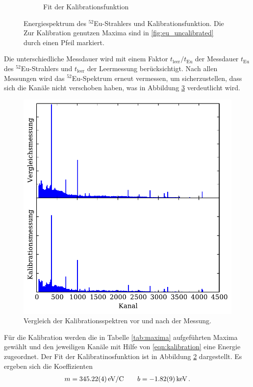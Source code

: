 \begin{figure}[htb]
\begin{subfigure}{.49\linewidth}
        \caption{
            Fit der Kalibrationsfunktion
        }
        \label{fig:calibration}
    \end{subfigure}
    \caption{
        Energiespektrum des $^{52}$Eu-Strahlers und Kalibrationsfunktion.
        Die Zur Kalibration genutzen Maxima sind in \ref{fig:eu_uncalibrated}
        durch einen Pfeil markiert.
    }
\end{figure}
Die unterschiedliche Messdauer wird mit einem Faktor $t_\text{leer} / t_\text{Eu}$
der Messdauer $t_\text{Eu}$ des $^{52}$Eu-Strahlers und $t_\text{leer}$ der
Leermessung berücksichtigt.
Nach allen Messungen wird das $^{52}$Eu-Spektrum erneut vermessen,
um sicherzustellen, dass sich die Kanäle nicht verschoben haben, was in Abbildung
\ref{fig:control} verdeutlicht wird.
\begin{figure}
    \centering
    \includegraphics[width=0.7\linewidth]{img/01_comp.pdf}
    \caption{
        Vergleich der Kalibrationsspektren vor und nach der Messung.
    }
    \label{fig:control}
\end{figure}
Für die Kalibration werden die in Tabelle \ref{tab:maxima} aufgeführten
Maxima gewählt und den jeweiligen Kanäle mit Hilfe von \eqref{eqn:kalibration}
eine Energie zugeordnet. Der Fit der Kalibratinosfunktion ist in Abbildung
\ref{fig:calibration} dargestellt. Es ergeben sich die Koeffizienten
%
\begin{align*}
     m = \SI{345.22+-0.04}{eV/C} \qquad b = \SI{-1.82+-0.09}{keV} \,.
\end{align*}

